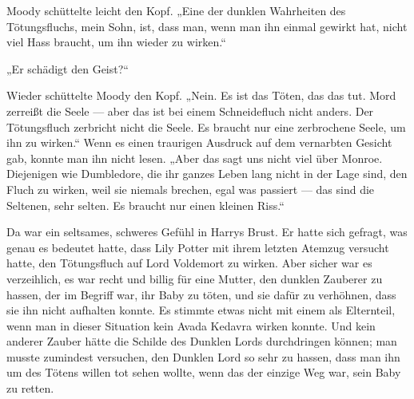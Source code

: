 Moody schüttelte leicht den Kopf.
„Eine der dunklen Wahrheiten des Tötungsfluchs, mein Sohn, ist, dass man, wenn man ihn einmal gewirkt hat, nicht viel Hass braucht, um ihn wieder zu wirken.“

„Er schädigt den Geist?“

Wieder schüttelte Moody den Kopf.
„Nein. Es ist das Töten, das das tut. Mord zerreißt die Seele — aber das ist bei einem Schneidefluch nicht anders. Der Tötungsfluch zerbricht nicht die Seele. Es braucht nur eine zerbrochene Seele, um ihn zu wirken.“
Wenn es einen traurigen Ausdruck auf dem vernarbten Gesicht gab, konnte man ihn nicht lesen.
„Aber das sagt uns nicht viel über Monroe. Diejenigen wie Dumbledore, die ihr ganzes Leben lang nicht in der Lage sind, den Fluch zu wirken, weil sie niemals brechen, egal was passiert — das sind die Seltenen, sehr selten. Es braucht nur einen kleinen Riss.“

Da war ein seltsames, schweres Gefühl in Harrys Brust. Er hatte sich gefragt, was genau es bedeutet hatte, dass Lily Potter mit ihrem letzten Atemzug versucht hatte, den Tötungsfluch auf Lord Voldemort zu wirken. Aber sicher war es verzeihlich, es war recht und billig für eine Mutter, den dunklen Zauberer zu hassen, der im Begriff war, ihr Baby zu töten, und sie dafür zu verhöhnen, dass sie ihn nicht aufhalten konnte. Es stimmte etwas nicht mit einem als Elternteil, wenn man in dieser Situation kein Avada Kedavra wirken konnte. Und kein anderer Zauber hätte die Schilde des Dunklen Lords durchdringen können; man musste zumindest versuchen, den Dunklen Lord so sehr zu hassen, dass man ihn um des Tötens willen tot sehen wollte, wenn das der einzige Weg war, sein Baby zu retten.

